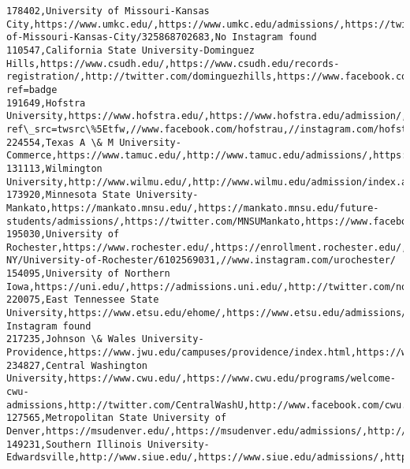 \documentclass[11pt]{article}
\begin{document}
\begin{Verbatim}[commandchars=\\\{\}]
178402,University of Missouri-Kansas City,https://www.umkc.edu/,https://www.umkc.edu/admissions/,https://twitter.com/umkansascity,https://www.facebook.com/pages/University-of-Missouri-Kansas-City/325868702683,No Instagram found
110547,California State University-Dominguez Hills,https://www.csudh.edu/,https://www.csudh.edu/records-registration/,http://twitter.com/dominguezhills,https://www.facebook.com/csudh/,http://instagram.com/csudominguezhills?ref=badge
191649,Hofstra University,https://www.hofstra.edu/,https://www.hofstra.edu/admission/,https://twitter.com/HofstraU?ref\_src=twsrc\%5Etfw,//www.facebook.com/hofstrau,//instagram.com/hofstrau
224554,Texas A \& M University-Commerce,https://www.tamuc.edu/,http://www.tamuc.edu/admissions/,https://twitter.com/tamuc,https://www.facebook.com/tamuc,https://instagram.com/tamuc/
131113,Wilmington University,http://www.wilmu.edu/,http://www.wilmu.edu/admission/index.aspx,https://twitter.com/theWilmU,https://www.facebook.com/WilmingtonUniversity,https://www.instagram.com/wilmingtonuniversity
173920,Minnesota State University-Mankato,https://mankato.mnsu.edu/,https://mankato.mnsu.edu/future-students/admissions/,https://twitter.com/MNSUMankato,https://www.facebook.com/MNStateMankato/,https://www.instagram.com/mnstatemankato/
195030,University of Rochester,https://www.rochester.edu/,https://enrollment.rochester.edu/,//www.twitter.com/UofR,//www.facebook.com/pages/Rochester-NY/University-of-Rochester/6102569031,//www.instagram.com/urochester/
154095,University of Northern Iowa,https://uni.edu/,https://admissions.uni.edu/,http://twitter.com/northerniowa,http://www.facebook.com/universityofnortherniowa,http://instagram.com/northern\_iowa
220075,East Tennessee State University,https://www.etsu.edu/ehome/,https://www.etsu.edu/admissions/,https://twitter.com/etsuadmissions,https://www.facebook.com/ETSUAdmissions/,No Instagram found
217235,Johnson \& Wales University-Providence,https://www.jwu.edu/campuses/providence/index.html,https://www.jwu.edu/admissions/,https://twitter.com/JWUProvidence,https://www.facebook.com/JWUProvidence,https://www.instagram.com/jwuprovidence/
234827,Central Washington University,https://www.cwu.edu/,https://www.cwu.edu/programs/welcome-cwu-admissions,http://twitter.com/CentralWashU,http://www.facebook.com/cwu.wildcats,https://www.instagram.com/central\_washington\_university/
127565,Metropolitan State University of Denver,https://msudenver.edu/,https://msudenver.edu/admissions/,http://twitter.com/msudenver,https://www.facebook.com/msudenver,https://instagram.com/msu\_denver
149231,Southern Illinois University-Edwardsville,http://www.siue.edu/,https://www.siue.edu/admissions/,https://twitter.com/siue,https://www.facebook.com/siuedwardsville,https://www.instagram.com/siuedwardsville/

\end{Verbatim}
\end{document}
